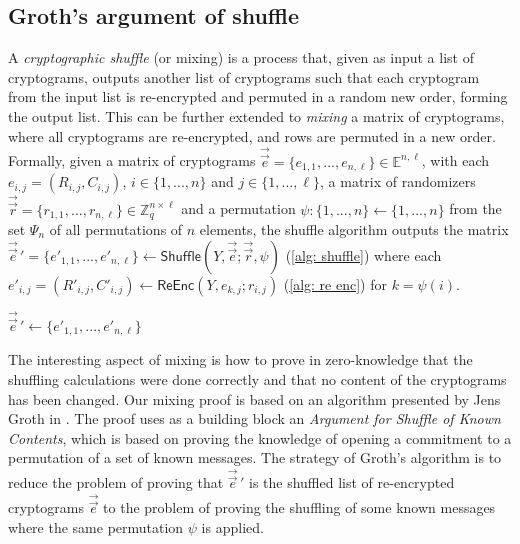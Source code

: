 \clearpage
\subsection{Groth's argument of shuffle} \label{app: groth's argument of shuffle}
A \textit{cryptographic shuffle} (or mixing) is a process that, given as input a list of cryptograms, outputs another list of cryptograms such that each cryptogram from the input list is re-encrypted and permuted in a random new order, forming the output list. This can be further extended to \textit{mixing} a matrix of cryptograms, where all cryptograms are re-encrypted, and rows are permuted in a new order. Formally, given a matrix of cryptograms $\vec{\vec{e}} = \{ e_{1, 1}, ..., e_{n, \ell}\} \in \mathbb{E}^{n, \ell}$, with each $e_{i, j} = (R_{i, j}, C_{i, j})$, $i \in \{ 1, ..., n \}$ and $j \in \{ 1, ..., \ell \}$, a matrix of randomizers $\vec{\vec{r}} = \{ r_{1, 1}, ..., r_{n, \ell} \} \in \mathbb{Z}_q^{n \times \ell}$ and a permutation $\psi: \{ 1, ..., n \} \gets \{ 1, ..., n \}$ from the set $\Psi_n$ of all permutations of $n$ elements, the shuffle algorithm outputs the matrix $\vec{\vec{e}}\,' = \{ e'_{1, 1}, ..., e'_{n, \ell} \} \gets \mathsf{Shuffle} (Y, \vec{\vec{e}}; \vec{\vec{r}}, \psi)$ (\cref{alg: shuffle}) where each $e'_{i, j} = (R'_{i, j}, C'_{i, j}) \gets \mathsf{ReEnc} (Y, e_{k, j}; r_{i, j})$ (\cref{alg: re enc}) for $k = \psi(i)$.

\begin{algorithm}[ht]
    \DontPrintSemicolon
    \caption{$\mathsf{Shuffle}(Y, \vec{\vec{e}}, \vec{\vec{r}}, \psi)$}
    \label{alg: shuffle}
    
    $\vec{\vec{e}}\,' \gets \{ e'_{1, 1}, ..., e'_{n, \ell} \}$ \;
     
\end{algorithm}

The interesting aspect of mixing is how to prove in zero-knowledge that the shuffling calculations were done correctly and that no content of the cryptograms has been changed. Our mixing proof is based on an algorithm presented by Jens Groth in \cite{Groth05}. The proof uses as a building block an \textit{Argument for Shuffle of Known Contents}, which is based on proving the knowledge of opening a commitment to a permutation of a set of known messages. The strategy of Groth's algorithm is to reduce the problem of proving that $\vec{\vec{e}}\,'$ is the shuffled list of re-encrypted cryptograms $\vec{\vec{e}}$ to the problem of proving the shuffling of some known messages where the same permutation $\psi$ is applied.

